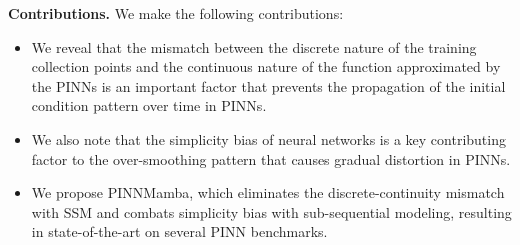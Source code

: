 \textbf{Contributions.} We make the following contributions:
\vspace{-4mm}
\begin{itemize}
    \item We reveal that the mismatch between the discrete nature of the training collection points and the continuous nature of the function approximated by the PINNs is an important factor that prevents the propagation of the initial condition pattern over time in PINNs.
    \vspace{-2mm}
    \item We also note that the simplicity bias of neural networks is a key contributing factor to the over-smoothing pattern that causes gradual distortion in PINNs.
    \vspace{-2mm}
    \item We propose PINNMamba, which eliminates the discrete-continuity mismatch with SSM and combats simplicity bias with sub-sequential modeling, resulting in state-of-the-art on several PINN benchmarks.
\end{itemize}
\vspace{-2mm}